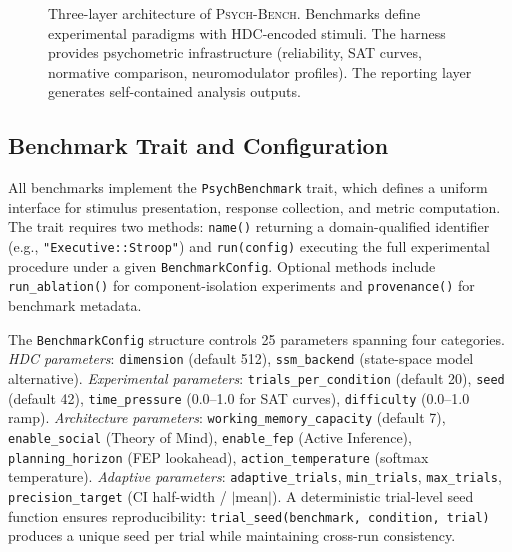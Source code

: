 \documentclass[11pt,letterpaper]{article}
\newcommand{\bind}{\otimes}
\newcommand{\symthaea}{\textsc{Symthaea}}
\newcommand{\psychbench}{\textsc{Psych-Bench}}
\begin{document}
\begin{figure}[t]
\caption{Three-layer architecture of \psychbench{}. Benchmarks define experimental paradigms with HDC-encoded stimuli. The harness provides psychometric infrastructure (reliability, SAT curves, normative comparison, neuromodulator profiles). The reporting layer generates self-contained analysis outputs.}
\label{fig:architecture}
\end{figure}

\subsection{Benchmark Trait and Configuration}

All benchmarks implement the \texttt{PsychBenchmark} trait, which defines a uniform interface for stimulus presentation, response collection, and metric computation. The trait requires two methods: \texttt{name()} returning a domain-qualified identifier (e.g., \texttt{"Executive::Stroop"}) and \texttt{run(config)} executing the full experimental procedure under a given \texttt{BenchmarkConfig}. Optional methods include \texttt{run\_ablation()} for component-isolation experiments and \texttt{provenance()} for benchmark metadata.

The \texttt{BenchmarkConfig} structure controls 25 parameters spanning four categories. \emph{HDC parameters}: \texttt{dimension} (default 512), \texttt{ssm\_backend} (state-space model alternative). \emph{Experimental parameters}: \texttt{trials\_per\_condition} (default 20), \texttt{seed} (default 42), \texttt{time\_pressure} (0.0--1.0 for SAT curves), \texttt{difficulty} (0.0--1.0 ramp). \emph{Architecture parameters}: \texttt{working\_memory\_capacity} (default 7), \texttt{enable\_social} (Theory of Mind), \texttt{enable\_fep} (Active Inference), \texttt{planning\_horizon} (FEP lookahead), \texttt{action\_temperature} (softmax temperature). \emph{Adaptive parameters}: \texttt{adaptive\_trials}, \texttt{min\_trials}, \texttt{max\_trials}, \texttt{precision\_target} (CI half-width / $|$mean$|$). A deterministic trial-level seed function ensures reproducibility: \texttt{trial\_seed(benchmark, condition, trial)} produces a unique seed per trial while maintaining cross-run consistency.
\end{document}
